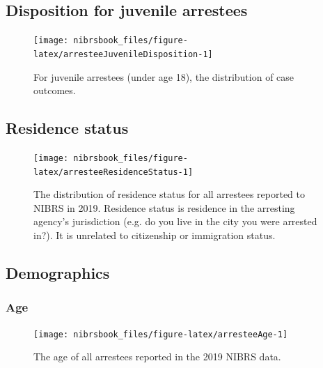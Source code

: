 \documentclass[
  12pt,
  openany]{book}
\begin{document}
\hypertarget{disposition-for-juvenile-arrestees}{%
\subsection{Disposition for juvenile arrestees}\label{disposition-for-juvenile-arrestees}}

\begin{figure}

{\centering \texttt{[image: nibrsbook\_files/figure-latex/arresteeJuvenileDisposition-1]} 

}

\caption{For juvenile arrestees (under age 18), the distribution of case outcomes.}\label{fig:arresteeJuvenileDisposition}
\end{figure}

\hypertarget{residence-status-1}{%
\subsection{Residence status}\label{residence-status-1}}

\begin{figure}

{\centering \texttt{[image: nibrsbook\_files/figure-latex/arresteeResidenceStatus-1]} 

}

\caption{The distribution of residence status for all arrestees reported to NIBRS in 2019. Residence status is residence in the arresting agency's jurisdiction (e.g. do you live in the city you were arrested in?). It is unrelated to citizenship or immigration status.}\label{fig:arresteeResidenceStatus}
\end{figure}

\hypertarget{demographics-1}{%
\subsection{Demographics}\label{demographics-1}}

\hypertarget{age-2}{%
\subsubsection{Age}\label{age-2}}

\begin{figure}

{\centering \texttt{[image: nibrsbook\_files/figure-latex/arresteeAge-1]} 

}

\caption{The age of all arrestees reported in the 2019 NIBRS data.}\label{fig:arresteeAge}
\end{figure}
\end{document}
